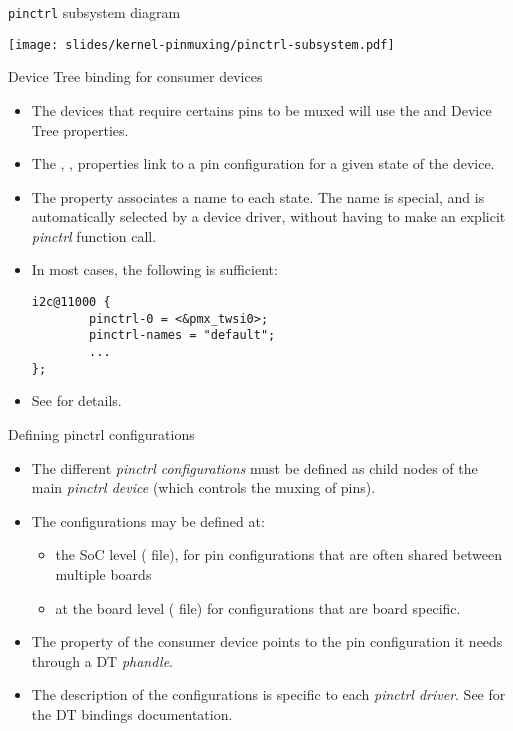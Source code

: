 \begin{frame}{{\tt pinctrl} subsystem diagram}
  \begin{center}
    \texttt{[image: slides/kernel-pinmuxing/pinctrl-subsystem.pdf]}
  \end{center}
\end{frame}

\begin{frame}[fragile]{Device Tree binding for consumer devices}
  \begin{itemize}
  \item The devices that require certains pins to be muxed will use
    the  and  Device Tree
    properties.
  \item The , , 
    properties link to a pin configuration for a given state of the
    device.
  \item The  property associates a name to each
    state. The name  is special, and is automatically
    selected by a device driver, without having to make an explicit
    {\em pinctrl} function call.
  \item In most cases, the following is sufficient:
    \begin{verbatim}
i2c@11000 {
        pinctrl-0 = <&pmx_twsi0>;
        pinctrl-names = "default";
        ...
};
\end{verbatim}
\item See
  for details.
\end{itemize}
\end{frame}

\begin{frame}{Defining pinctrl configurations}
  \begin{itemize}
  \item The different {\em pinctrl configurations} must be defined as
    child nodes of the main {\em pinctrl device} (which controls the
    muxing of pins).
  \item The configurations may be defined at:
    \begin{itemize}
    \item the SoC level ( file), for pin configurations
      that are often shared between multiple boards
    \item at the board level ( file) for configurations
      that are board specific.
    \end{itemize}
  \item The  property of the consumer device points
    to the pin configuration it needs through a DT {\em phandle}.
  \item The description of the configurations is specific to each {\em
      pinctrl driver}. See
     for the DT
    bindings documentation.
  \end{itemize}
\end{frame}

